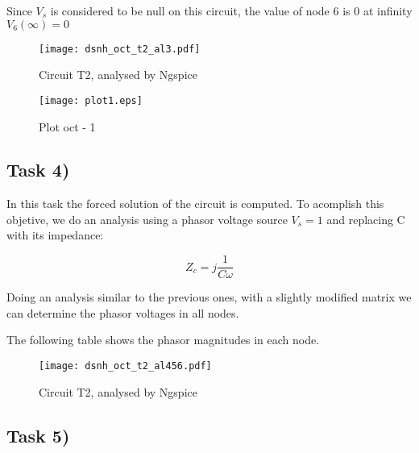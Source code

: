 Since $V_s$ is considered to be null on this circuit, the value of node 6 is 0 at infinity $V_6(\infty) = 0$ 


\begin{figure}[ht]
	\centering
	\texttt{[image: dsnh\_oct\_t2\_al3.pdf]}
	\caption{Circuit T2, analysed by Ngspice}
\label{fig:Dsnh_sim_t2}
\end{figure}

\begin{figure}[ht]
	\centering
	\texttt{[image: plot1.eps]}
	\caption{Plot oct - 1}
\label{fig:Dsnh_sim_t2}
\end{figure}

\subsection{Task 4)}
\label{subsec:task4_a}

In this task the forced solution of the circuit is computed. To acomplish this objetive, we do an analysis using a phasor voltage source $V_s=1$ and replacing C with its impedance:

\[
Z_c = j\frac{1}{C\omega}
\]

Doing an analysis similar to the previous ones, with a slightly modified matrix we can determine the phasor voltages in all nodes.

The following table shows the phasor magnitudes in each node.


\begin{figure}[ht]
	\centering
	\texttt{[image: dsnh\_oct\_t2\_al456.pdf]}
	\caption{Circuit T2, analysed by Ngspice}
\label{fig:Dsnh_sim_t2}
\end{figure}

\subsection{Task 5)}
\label{subsec:task5_a}

